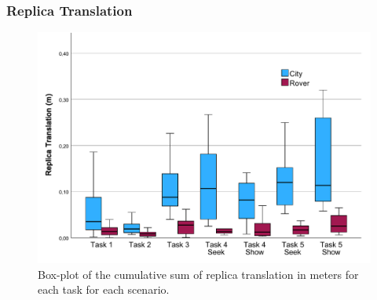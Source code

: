        \subsubsection{Replica Translation}

            
            \begin{figure}[h!]
                \centering
                \includegraphics[width=1\linewidth]{figures/replica_translation_graph.pdf}
                \caption{Box-plot of the cumulative sum of replica translation in meters for each task for each scenario.}
                \label{fig:task_time}
            \end{figure}


